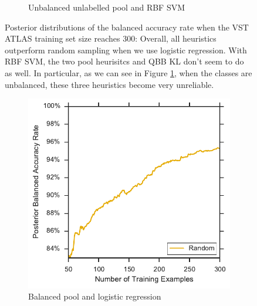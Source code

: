 \begin{figure}[p]
\begin{subfigure}{\textwidth}
		\caption{Unbalanced unlabelled pool and RBF SVM}
		\label{fig:vstatlas_ur_ind_violin}
	\end{subfigure}
	\caption[Violin plots of balanced accuracy rate (VST ATLAS)]{
		Posterior distributions of the balanced accuracy rate when the VST ATLAS training set size reaches 300: Overall, all heuristics outperform random sampling when we use logistic regression. With RBF SVM, the two pool heurisitcs and QBB KL don't seem to do as well.
		In particular, as we can see in Figure \ref{fig:vstatlas_ur_ind_violin}, when the classes are unbalanced, these three heuristics become very unreliable.}
	\label{fig:vstatlas_bl_ind}
\end{figure}


\begin{figure}[p]
	\centering
	\begin{subfigure}{.5\textwidth}
		\centering
		\includegraphics[width=\textwidth]{figures/5_active/vstatlas_bl_ind_lower}
		\caption{Balanced pool and logistic regression}
		\label{fig:vstatlas_bl_ind_lower}
	\end{subfigure}%
	\begin{subfigure}{.5\textwidth}
		\centering

\end{subfigure}
\end{figure}
